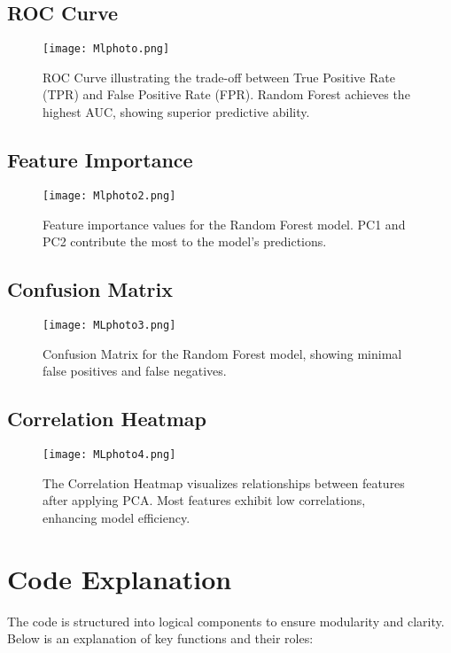 \documentclass[journal]{IEEEtran}
\begin{document}
\subsection{ROC Curve}
\begin{figure}[H]
    \centering
    \texttt{[image: Mlphoto.png]}
    \caption{ROC Curve illustrating the trade-off between True Positive Rate (TPR) and False Positive Rate (FPR). Random Forest achieves the highest AUC, showing superior predictive ability.}
    \label{fig:roc_curve}
\end{figure}

\subsection{Feature Importance}
\begin{figure}[H]
    \centering
    \texttt{[image: Mlphoto2.png]}
    \caption{Feature importance values for the Random Forest model. PC1 and PC2 contribute the most to the model's predictions.}
    \label{fig:feature_importance}
\end{figure}

\subsection{Confusion Matrix}
\begin{figure}[H]
    \centering
    \texttt{[image: MLphoto3.png]}
    \caption{Confusion Matrix for the Random Forest model, showing minimal false positives and false negatives.}
    \label{fig:confusion_matrix}
\end{figure}

\subsection{Correlation Heatmap}
\begin{figure}[H]
    \centering
    \texttt{[image: MLphoto4.png]}
    \caption{The Correlation Heatmap visualizes relationships between features after applying PCA. Most features exhibit low correlations, enhancing model efficiency.}
    \label{fig:heatmap}
\end{figure}

\section{Code Explanation}
The code is structured into logical components to ensure modularity and clarity. Below is an explanation of key functions and their roles:
\end{document}
